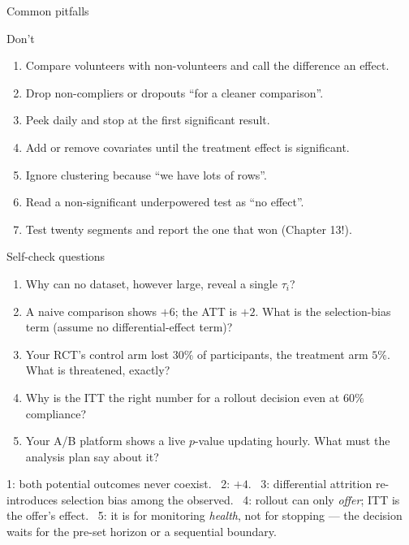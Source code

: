 \documentclass[aspectratio=169,11pt]{beamer}
\begin{document}
\begin{frame}{Common pitfalls}
  \begin{alertblock}{Don't}
    \begin{enumerate}
      \item Compare volunteers with non-volunteers and call the difference an effect.
      \item Drop non-compliers or dropouts ``for a cleaner comparison''.
      \item Peek daily and stop at the first significant result.
      \item Add or remove covariates until the treatment effect is significant.
      \item Ignore clustering because ``we have lots of rows''.
      \item Read a non-significant underpowered test as ``no effect''.
      \item Test twenty segments and report the one that won (Chapter 13!).
    \end{enumerate}
  \end{alertblock}
\end{frame}

\begin{frame}{Self-check questions}
  \begin{readme}
    \begin{enumerate}
      \item Why can no dataset, however large, reveal a single $\tau_i$?
      \item A naive comparison shows $+6$; the ATT is $+2$. What is the selection-bias
            term (assume no differential-effect term)?
      \item Your RCT's control arm lost $30\%$ of participants, the treatment arm $5\%$.
            What is threatened, exactly?
      \item Why is the ITT the right number for a rollout decision even at $60\%$
            compliance?
      \item Your A/B platform shows a live $p$-value updating hourly. What must the
            analysis plan say about it?
    \end{enumerate}
  \end{readme}
  \begin{takeaway}
    1: both potential outcomes never coexist. \ 2: $+4$. \ 3: differential attrition
    re-introduces selection bias among the observed. \ 4: rollout can only \emph{offer};
    ITT is the offer's effect. \ 5: it is for monitoring \emph{health}, not for stopping
    --- the decision waits for the pre-set horizon or a sequential boundary.
  \end{takeaway}
\end{frame}
\end{document}
